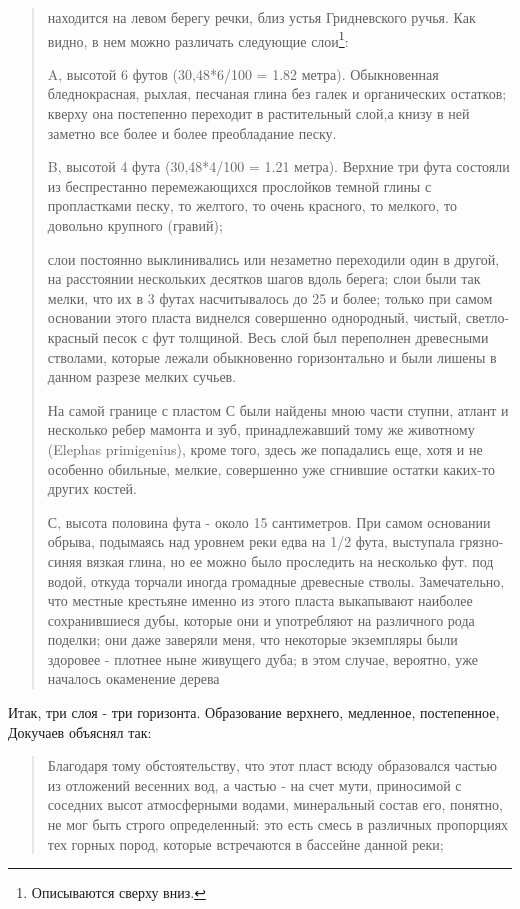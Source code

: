 \begin{quotation}
находится на левом берегу речки, близ устья Гридневского ручья. Как видно, в нем можно различать следующие слои\footnote{Описываются сверху вниз.}:

A, высотой 6 футов (30,48*6/100 = 1.82 метра). Обыкновенная бледнокрасная, рыхлая, песчаная глина без галек и органических остатков; кверху она постепенно переходит в растительный слой,а книзу в ней заметно все более и более преобладание песку. 

B, высотой 4 фута (30,48*4/100 = 1.21 метра). Верхние три фута состояли из беспрестанно перемежающихся прослойков темной глины с пропластками песку, то желтого, то очень красного, то мелкого, то довольно крупного (гравий); 

слои постоянно выклинивались или незаметно переходили один в другой, на расстоянии нескольких десятков шагов вдоль берега; слои были так мелки, что их в 3 футах насчитывалось до 25 и более; только при самом основании этого пласта виднелся совершенно однородный, чистый, светло-красный песок с фут толщиной. Весь слой был переполнен древесными стволами, которые лежали обыкновенно горизонтально и были лишены в данном разрезе мелких сучьев. 

На самой границе с пластом С были найдены мною части ступни, атлант и несколько ребер мамонта и зуб, принадлежавший тому же животному (Elephas primigenius), кроме того, здесь же попадались еще, хотя и не особенно обильные, мелкие, совершенно уже сгнившие остатки каких-то других костей.

С, высота половина фута - около 15 сантиметров. При самом основании обрыва, подымаясь над уровнем реки едва на 1/2 фута, выступала грязно-синяя вязкая глина, но ее можно было проследить на несколько фут. под водой, откуда торчали иногда громадные древесные стволы. Замечательно, что местные крестьяне именно из этого пласта выкапывают наиболее сохранившиеся дубы, которые они и употребляют на различного рода поделки; они даже заверяли меня, что некоторые экземпляры были здоровее - плотнее ныне живущего дуба; в этом случае, вероятно, уже началось окаменение дерева 
\end{quotation}

Итак, три слоя - три горизонта. Образование верхнего, медленное, постепенное, Докучаев объяснял так:

\begin{quotation}
Благодаря тому обстоятельству, что этот пласт всюду образовался частью из отложений весенних вод, а частью - на счет мути, приносимой с соседних высот атмосферными водами, минеральный состав его, понятно, не мог быть строго определенный: это есть смесь в различных пропорциях тех горных пород, которые встречаются в бассейне данной реки;\end{quotation}

